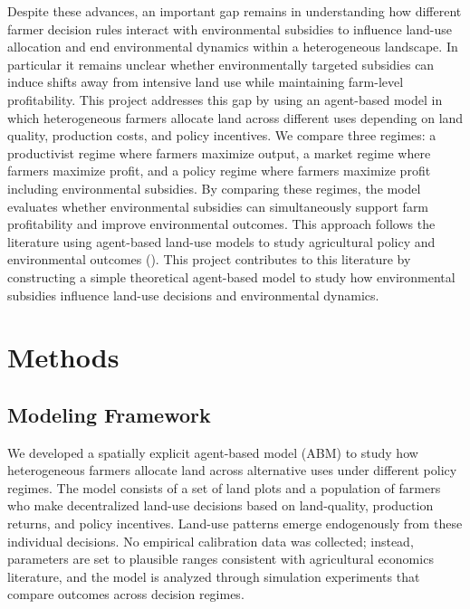 \documentclass{article}
\begin{document}
Despite these advances, an important gap remains in understanding how different farmer decision rules interact with environmental subsidies to influence land-use allocation and end environmental dynamics within a heterogeneous landscape. In particular it remains unclear whether environmentally targeted subsidies can induce shifts away from intensive land use while maintaining farm-level profitability. This project addresses this gap by using an agent-based model in which heterogeneous farmers allocate land across different uses depending on land quality, production costs, and policy incentives. We compare three regimes: a productivist regime where farmers maximize output, a market regime where farmers maximize profit, and a policy regime where farmers maximize profit including environmental subsidies. By comparing these regimes, the model evaluates whether environmental subsidies can simultaneously support farm profitability and improve environmental outcomes. This approach follows the literature using agent-based land-use models to study agricultural policy and environmental outcomes (\cite{matthews2007abm, dai2020landsystem, baldi2025cap}). This project contributes to this literature by constructing a simple theoretical agent-based model to study how environmental subsidies influence land-use decisions and environmental dynamics.

\section{Methods}
\subsection{Modeling Framework}
We developed a spatially explicit agent-based model (ABM) to study how heterogeneous farmers allocate land across alternative uses under different policy regimes. The model consists of a set of land plots and a population of farmers who make decentralized land-use decisions based on land-quality, production returns, and policy incentives. Land-use patterns emerge endogenously from these individual decisions. No empirical calibration data was collected; instead, parameters are set to plausible ranges consistent with agricultural economics literature, and the model is analyzed through simulation experiments that compare outcomes across decision regimes. 
\end{document}
